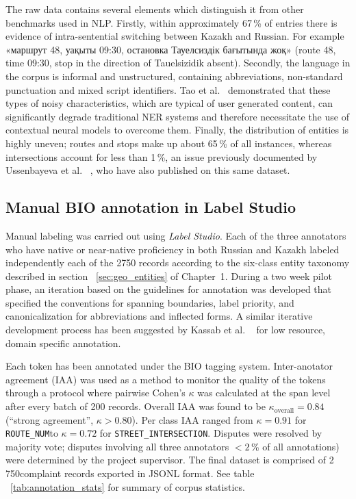 The raw data contains several elements which distinguish it from other benchmarks used in NLP. Firstly, within approximately 67\,\% of entries there is evidence of intra-sentential switching between Kazakh and Russian. For example \foreignlanguage{russian}{«маршрут 48, уақыты 09:30, остановка Тауелсиздік бағытында жоқ»} (route 48, time 09:30, stop in the direction of Tauelsizidik absent). Secondly, the language in the corpus is informal and unstructured, containing abbreviations, non-standard punctuation and mixed script identifiers. Tao et al.~\cite{tao2022socialNER} demonstrated that these types of noisy characteristics, which are typical of user generated content, can significantly degrade traditional NER systems and therefore necessitate the use of contextual neural models to overcome them. Finally, the distribution of entities is highly uneven; routes and stops make up about 65\,\% of all instances, whereas intersections account for less than 1\,\%, an issue previously documented by Ussenbayeva et al. ~\cite{ussenbayeva2026heterogeneous}, who have also published on this same dataset.


\subsection{Manual BIO annotation in Label Studio}
\label{sec:annotation}

Manual labeling was carried out using \textit{Label Studio}. Each of the three annotators who have native or near-native proficiency in both Russian and Kazakh labeled independently each of the 2750 records according to the six-class entity taxonomy described in section ~\ref{sec:geo_entities} of Chapter~1. During a two week pilot phase, an iteration based on the guidelines for annotation was developed that specified the conventions for spanning boundaries, label priority, and canonicalization for abbreviations and inflected forms. A similar iterative development process has been suggested by Kassab et al. ~\cite{kassab2025russian} for low resource, domain specific annotation.

Each token has been annotated under the BIO tagging system. Inter-anotator agreement (IAA) was used as a method to monitor the quality of the tokens through a protocol where pairwise Cohen's $\kappa$ was calculated at the span level after every batch of 200 records. Overall IAA was found to be $\kappa_{\text{overall}} = 0.84$ (``strong agreement'', $\kappa > 0.80$). Per class IAA ranged from $\kappa = 0.91$ for \texttt{ROUTE\_NUM}to $\kappa = 0.72$ for \texttt{STREET\_INTERSECTION}. Disputes were resolved by majority vote; disputes involving all three annotators $<2$\,\% of all annotations) were determined by the project supervisor. The final dataset is comprised of 2\,750complaint records exported in JSONL format. See table ~\ref{tab:annotation_stats} for summary of corpus statistics.


